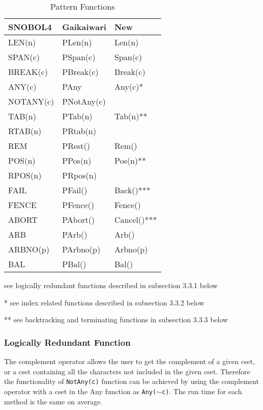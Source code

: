 \documentclass{article}
\begin{document}
\begin{table}[ht]
	\begin{threeparttable}
		\caption{Pattern Functions}
		\centering
		\begin{tabular}{|l|l|l|}
			\hline\hline
			SNOBOL4 & Gaikaiwari & New \\
			\hline
			LEN(n) & PLen(n) & Len(n) \\
			SPAN(c) & PSpan(c) & Span(c)  \\
			BREAK(c) & PBreak(c) & Break(c) \\
			ANY(c) & PAny & Any(c)* \\
			NOTANY(c) & PNotAny(c) &  \\
			TAB(n) & PTab(n) & Tab(n)** \\
			RTAB(n) & PRtab(n) &  \\
			REM & PRest() & Rem() \\
			POS(n) & PPos(n) & Pos(n)**  \\
			RPOS(n) & PRpos(n) &  \\
			FAIL & PFail() & Back()*** \\
			FENCE & PFence() & Fence() \\
			ABORT & PAbort() & Cancel()*** \\
			ARB & PArb() & Arb() \\
			ARBNO(p) & PArbno(p) & Arbno(p) \\
			BAL & PBal() & Bal() \\
			\hline
		\end{tabular}
		
		\begin{tablenotes}
      		\small
      		\item * see logically redundant functions described in subsection 3.3.1 below
      		\item ** see index related functions described in subsection 3.3.2 below
      		\item *** see backtracking and terminating functions in subsection 3.3.3 below
      	\end{tablenotes}
	\end{threeparttable}
\end{table}


\vspace{1 pc}
\subsubsection{Logically Redundant Function}
The complement operator allows the user to get the complement of a given cset, or a cset containing all the characters not included in the given cset.  Therefore the functionality of \texttt{NotAny(c)} function can be achieved by using the complement operator with a cset in the Any function as \texttt{Any($\sim$c)}.  The run time for each method is the same on average.
\end{document}
